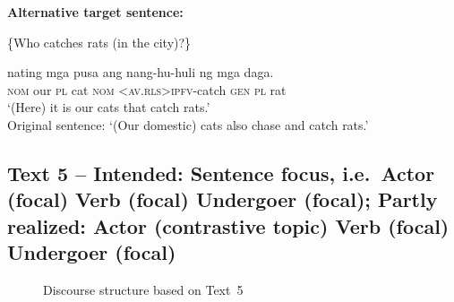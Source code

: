 \documentclass[output=paper,
,modfonts
,nonflat]{langsci/langscibook}
\begin{document}
\begin{exe}
\ex\label{text4_part6}\textbf{Alternative target sentence:}
\begin{xlist}
 \{Who catches rats (in the city)?\}
\end{xlist}
\begin{xlist}[{>}>{>}> A\textsubscript{4}:]
 nating mga {pusa{\cb}\focus} ang  {nang-hu-huli} {{\ob}ng} mga {daga{\cb}\topic{\cb}\sq}.\\
\textsc{\void{[[}nom} our \textsc{pl} cat \textsc{nom} \textsc{<av.rls>ipfv}-catch \textsc{\void{[}gen} \textsc{pl} rat\\ 
\glt `(Here) it is our cats that catch rats.'\\
Original sentence: `(Our domestic) cats also chase and catch rats.' 
\end{xlist}
\end{exe}


\subsection{Text 5 -- Intended: Sentence focus, i.e.\ Actor (focal) Verb (focal) Undergoer (focal); Partly realized: Actor (contrastive topic) Verb (focal) Undergoer (focal)}\label{sect:text_new}

\begin{figure}
\caption{Discourse structure based on Text~5}
\label{fig:text5_analysis1}
\end{figure}
\end{document}
